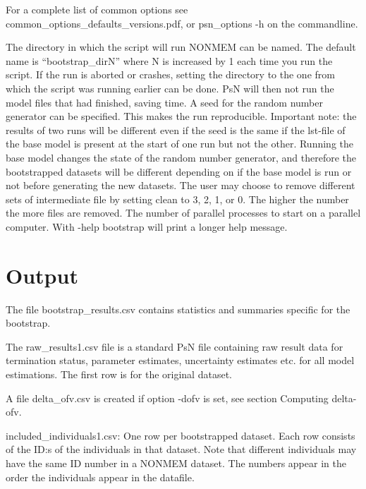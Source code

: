 For a complete list of common options see common\_options\_defaults\_versions.pdf, or psn\_options -h on the commandline.

\begin{optionlist}
The directory in which the script will run NONMEM can be named. The default name is “bootstrap\_dirN” where N is increased by 1 each time you run the script. If the run is aborted or crashes, setting the directory to the one from which the script was running earlier can be done. PsN will then not run the model files that had finished, saving time. 
\nextopt
{}
A seed for the random number generator can be specified. This makes the run reproducible. Important note: the results of two runs will be different even if the seed is the same if the lst-file of the base model is present at the start of one run but not the other. Running the base model changes the state of the random number generator, and therefore the bootstrapped datasets will be different depending on if the base model is run or not before generating the  new datasets. 
\nextopt
{}
The user may choose to remove different sets of intermediate file by setting clean to 3, 2, 1, or 0. The higher the number the more files are removed. 
\nextopt
{}
The number of parallel processes to start on a parallel computer. 
\nextopt
{}
With -help bootstrap will print a longer help message. 
\nextopt
\end{optionlist}


\section{Output}

The file bootstrap\_results.csv contains statistics and summaries specific for the bootstrap.

The raw\_results1.csv file is a standard PsN file containing raw result data for termination status, parameter estimates, uncertainty estimates etc. for all model estimations. The first row is for the original dataset.

A file delta\_ofv.csv is created if option -dofv is set, see section Computing delta-ofv.

included\_individuals1.csv: One row per bootstrapped dataset. Each row consists of the ID:s of the individuals in that dataset. Note that different individuals may have the same ID number in a NONMEM dataset. The numbers appear in the order the individuals appear in the datafile.

